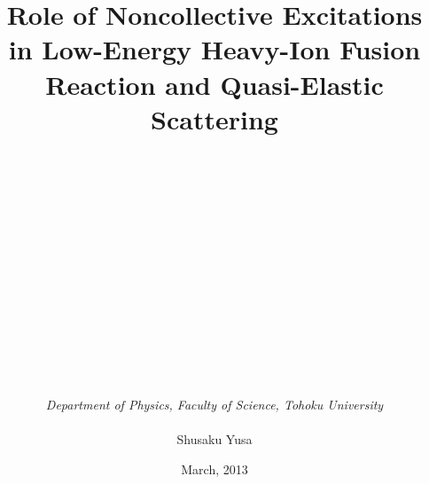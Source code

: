\usepackage{geometry}
\usepackage{amsmath}
\usepackage{txfonts}
\usepackage{layout}
\usepackage{setspace}
\geometry{a4paper, left=22mm, right=22mm, top=25mm, bottom=25mm}
\usepackage{wrapfig}
\usepackage[dvipdfm]{graphicx,hyperref}
\usepackage{mediabb}
\title{\Huge\bf{Role of Noncollective Excitations in Low-Energy Heavy-Ion Fusion Reaction
and Quasi-Elastic Scattering}}
\author{\\\\\\\\\\\\\\\\\\\\\\\\\\\\{\it\Large Department of Physics, Faculty of Science, Tohoku University}\\\\
\Huge Shusaku Yusa}
\date{March, 2013}


